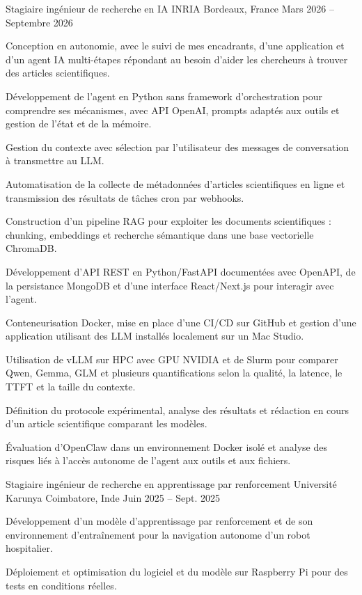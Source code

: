 
\begin{cventries}
  \cventry
    {Stagiaire ingénieur de recherche en IA}
    {INRIA}
    {Bordeaux, France}
    {Mars 2026 -- Septembre 2026}
    {
      \begin{cvitems}
        \item {Conception en autonomie, avec le suivi de mes encadrants, d’une application et d’un agent IA multi-étapes répondant au besoin d’aider les chercheurs à trouver des articles scientifiques.}
        \item {Développement de l’agent en Python sans framework d’orchestration pour comprendre ses mécanismes, avec API OpenAI, prompts adaptés aux outils et gestion de l’état et de la mémoire.}
        \item {Gestion du contexte avec sélection par l’utilisateur des messages de conversation à transmettre au LLM.}
        \item {Automatisation de la collecte de métadonnées d’articles scientifiques en ligne et transmission des résultats de tâches cron par webhooks.}
        \item {Construction d’un pipeline RAG pour exploiter les documents scientifiques : chunking, embeddings et recherche sémantique dans une base vectorielle ChromaDB.}
        \item {Développement d’API REST en Python/FastAPI documentées avec OpenAPI, de la persistance MongoDB et d’une interface React/Next.js pour interagir avec l’agent.}
        \item {Conteneurisation Docker, mise en place d’une CI/CD sur GitHub et gestion d’une application utilisant des LLM installés localement sur un Mac Studio.}
        \item {Utilisation de vLLM sur HPC avec GPU NVIDIA et de Slurm pour comparer Qwen, Gemma, GLM et plusieurs quantifications selon la qualité, la latence, le TTFT et la taille du contexte.}
        \item {Définition du protocole expérimental, analyse des résultats et rédaction en cours d’un article scientifique comparant les modèles.}
        \item {Évaluation d’OpenClaw dans un environnement Docker isolé et analyse des risques liés à l’accès autonome de l’agent aux outils et aux fichiers.}
      \end{cvitems}
    }

  \cventry
    {Stagiaire ingénieur de recherche en apprentissage par renforcement}
    {Université Karunya}
    {Coimbatore, Inde}
    {Juin 2025 -- Sept. 2025}
    {
      \begin{cvitems}
        \item {Développement d’un modèle d’apprentissage par renforcement et de son environnement d’entraînement pour la navigation autonome d’un robot hospitalier.}
        \item {Déploiement et optimisation du logiciel et du modèle sur Raspberry Pi pour des tests en conditions réelles.}
      \end{cvitems}
    }
\end{cventries}
